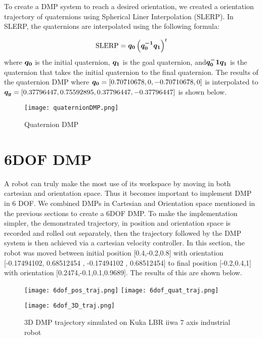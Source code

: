 To create a DMP system to reach a desired orientation, we created a orientation trajectory of quaternions using Spherical Liner Interpolation
(SLERP). In SLERP, the quaternions are interpolated using the following formula:

\begin{equation}
    \text{SLERP} = \boldsymbol{q_0} \left( \boldsymbol{q_0^{-1} q_1} \right)^t
\end{equation}
where $\boldsymbol{q_0}$ is the initial quaternion, $\boldsymbol{q_1}$ is the goal quaternion, and$\boldsymbol{q_0^-1 q_1}$ is 
the quaternion that takes the initial quaternion to the final quaternion. The results of the quaternion DMP where 
$\boldsymbol{q_0} =[0.70710678,0,-0.70710678,0] $  is interpolated to 
$\boldsymbol{q_g} = [0.37796447 , 0.75592895  ,0.37796447, -0.37796447]$ is shown below.

\begin{figure}[h]
\centering
\texttt{[image: quaternionDMP.png]}
\caption{Quaternion DMP}
\label{fig:quaternionDMP}
\end{figure}




\section{6DOF DMP}
A robot can truly make the most use of its workspace by moving in both cartesian and orientation space. 
Thus it becomes important to implement DMP in 6 DOF. We combined DMPs in Cartesian and Orientation space mentioned in the previous sections to create a 6DOF DMP.
To make the implementation simpler, the demonstrated trajectory, in position and orientation space is recorded and rolled out separately,
then the trajectory followed by the DMP system is then achieved via a cartesian velocity controller. In this section, the robot was moved between initial position [0.4,-0.2,0.8] with 
orientation [-0.17494102, 0.68512454 , -0.17494102 , 0.68512454] 
to final position [-0.2,0.4,1] with orientation [0.2474,-0.1,0.1,0.9689]. The results of this are shown below.

\begin{figure}[h]
    \centering
    \texttt{[image: 6dof\_pos\_traj.png]}\quad
    \texttt{[image: 6dof\_quat\_traj.png]}

    \medskip

    \texttt{[image: 6dof\_3D\_traj.png]}

    \caption{3D DMP trajectory simulated on Kuka LBR iiwa 7 axis industrial robot}
    \label{fig:3D_only_taj_pybullet}
\end{figure}



